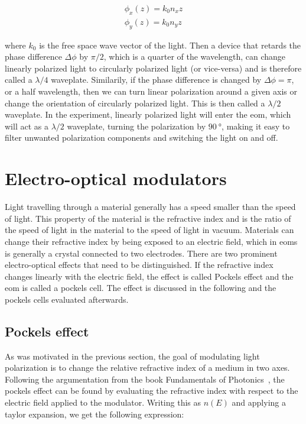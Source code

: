 \begin{align}
	\label{eq:pol,phases}
	\phi_x(z) = k_0 n_x z \\
	\phi_y(z) = k_0 n_y z
\end{align}

where $k_0$ is the free space wave vector of the light. Then a device that retards the phase difference $\Delta \phi$ by $\pi/2$, which is a quarter of the wavelength, can change linearly polarized light to circularly polarized light (or vice-versa) and is therefore called a $\lambda / 4$ waveplate. Similarily, if the phase difference is changed by $\Delta \phi = \pi$, or a half wavelength, then we can turn linear polarization around a given axis or change the orientation of circularly polarized light. This is then called a $\lambda / 2$ waveplate. In the experiment, linearly polarized light will enter the \ac{eom}, which will act as a $\lambda / 2$ waveplate, turning the polarization by $\SI{90}{\degree}$, making it easy to filter unwanted polarization components and switching the light on and off.

\section{Electro-optical modulators}%
\label{sec:eom}

Light travelling through a material generally has a speed smaller than the speed of light. This property of the material is the refractive index and is the ratio of the speed of light in the material to the speed of light in vacuum. Materials can change their refractive index by being exposed to an electric field, which in \acp{eom} is generally a crystal connected to two electrodes. There are two prominent electro-optical effects that need to be distinguished. If the refractive index changes linearly with the electric field, the effect is called Pockels effect and the \ac{eom} is called a pockels cell. The effect is discussed in the following and the pockels cells evaluated afterwards.

\subsection{Pockels effect}%
\label{sec:pockels_effect}

As was motivated in the previous section, the goal of modulating light polarization is to change the relative refractive index of a medium in two axes. Following the argumentation from the book Fundamentals of Photonics~\cite{Saleh1991}, the pockels effect can be found by evaluating the refractive index with respect to the electric field applied to the modulator. Writing this as $n(E)$ and applying a taylor expansion, we get the following expression:


